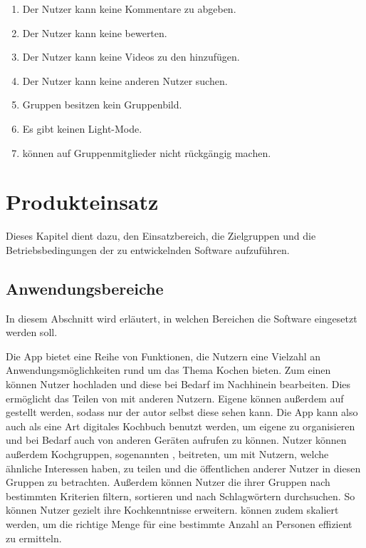 \documentclass[parskip=full]{scrartcl}
\begin{document}
\begin{enumerate}[start=1,label={$\langle$\bfseries RW\arabic*$\rangle$}, leftmargin = 5em, itemsep=4pt, parsep=4pt]
    \item Der Nutzer kann keine Kommentare zu  abgeben.
    \item Der Nutzer kann keine  bewerten.
    \item Der Nutzer kann keine Videos zu den  hinzufügen.
    \item Der Nutzer kann keine anderen Nutzer suchen.
    \item Gruppen besitzen kein Gruppenbild.
    \item Es gibt keinen Light-Mode.
    \item {} können  auf Gruppenmitglieder nicht rückgängig machen.
\end{enumerate}

\section{Produkteinsatz}
Dieses Kapitel dient dazu, den Einsatzbereich, die Zielgruppen und die Betriebsbedingungen der zu entwickelnden Software aufzuführen.

\subsection{Anwendungsbereiche}
In diesem Abschnitt wird erläutert, in welchen Bereichen die Software eingesetzt werden soll. \par
Die App bietet eine Reihe von Funktionen, die Nutzern eine Vielzahl an Anwendungsmöglichkeiten rund um das Thema Kochen bieten.
Zum einen können Nutzer  hochladen und diese bei Bedarf im Nachhinein bearbeiten.
Dies ermöglicht das Teilen von  mit anderen Nutzern. Eigene  können außerdem auf  gestellt werden, sodass nur der \gls{autor} selbst diese sehen kann.
Die App kann also auch als eine Art digitales Kochbuch benutzt werden, um eigene  zu organisieren und bei Bedarf auch von anderen Geräten aufrufen zu können.
Nutzer können außerdem Kochgruppen, sogenannten , beitreten, um  mit Nutzern, welche ähnliche Interessen haben, zu teilen und die öffentlichen  anderer Nutzer in diesen Gruppen zu betrachten. Außerdem können Nutzer die  ihrer Gruppen nach bestimmten Kriterien filtern, sortieren und nach Schlagwörtern durchsuchen. So können Nutzer gezielt ihre Kochkenntnisse erweitern.
 können zudem skaliert werden, um die richtige Menge für eine bestimmte Anzahl an Personen effizient zu ermitteln.
\end{document}
